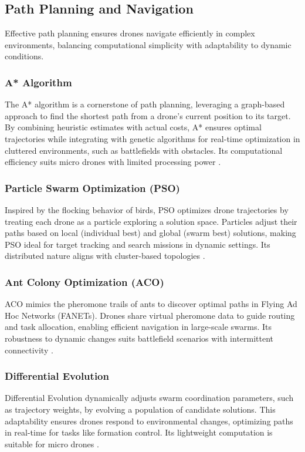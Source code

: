 \documentclass{article}
\begin{document}
\subsection{Path Planning and Navigation}
Effective path planning ensures drones navigate efficiently in complex environments, balancing computational simplicity with adaptability to dynamic conditions.

\subsubsection{A* Algorithm}
The A* algorithm is a cornerstone of path planning, leveraging a graph-based approach to find the shortest path from a drone’s current position to its target. By combining heuristic estimates with actual costs, A* ensures optimal trajectories while integrating with genetic algorithms for real-time optimization in cluttered environments, such as battlefields with obstacles. Its computational efficiency suits micro drones with limited processing power \cite{Hart1968, Liu2019}.

\subsubsection{Particle Swarm Optimization (PSO)}
Inspired by the flocking behavior of birds, PSO optimizes drone trajectories by treating each drone as a particle exploring a solution space. Particles adjust their paths based on local (individual best) and global (swarm best) solutions, making PSO ideal for target tracking and search missions in dynamic settings. Its distributed nature aligns with cluster-based topologies \cite{Kennedy1995, Zhang2017}.

\subsubsection{Ant Colony Optimization (ACO)}
ACO mimics the pheromone trails of ants to discover optimal paths in Flying Ad Hoc Networks (FANETs). Drones share virtual pheromone data to guide routing and task allocation, enabling efficient navigation in large-scale swarms. Its robustness to dynamic changes suits battlefield scenarios with intermittent connectivity \cite{Dorigo1997, Yang2018}.

\subsubsection{Differential Evolution}
Differential Evolution dynamically adjusts swarm coordination parameters, such as trajectory weights, by evolving a population of candidate solutions. This adaptability ensures drones respond to environmental changes, optimizing paths in real-time for tasks like formation control. Its lightweight computation is suitable for micro drones \cite{Storn1997, Das2016}.
\end{document}
